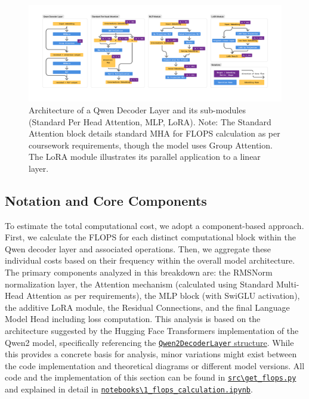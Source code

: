 \documentclass{article}
\begin{document}
\begin{figure}[!htbp]
    \centering
    \includegraphics[width=1\linewidth]{M2 Course Work//Images/Qwen_Arch.png} 
    \caption{Architecture of a Qwen Decoder Layer and its sub-modules (Standard Per Head Attention, MLP, LoRA). Note: The Standard Attention block details standard MHA for FLOPS calculation as per coursework requirements, though the model uses Group Attention. The LoRA module illustrates its parallel application to a linear layer.}
    \label{fig:qwen_arch} 
\end{figure}


\subsection{Notation and Core Components}

To estimate the total computational cost, we adopt a component-based approach. First, we calculate the FLOPS for each distinct computational block within the Qwen decoder layer and associated operations. Then, we aggregate these individual costs based on their frequency within the overall model architecture. The primary components analyzed in this breakdown are: the RMSNorm normalization layer, the Attention mechanism (calculated using Standard Multi-Head Attention as per requirements), the MLP block (with SwiGLU activation), the additive LoRA module, the Residual Connections, and the final Language Model Head including loss computation. This analysis is based on the architecture suggested by the Hugging Face Transformers implementation of the Qwen2 model, specifically referencing the \href{https://github.com/huggingface/transformers/blob/main/src/transformers/models/qwen2/modeling_qwen2.py}{\texttt{Qwen2DecoderLayer} structure}. While this provides a concrete basis for analysis, minor variations might exist between the code implementation and theoretical diagrams or different model versions. All code and the implementation of this section can be found in \href{https://gitlab.developers.cam.ac.uk/phy/data-intensive-science-mphil/assessments/m2_coursework/ym429/-/blob/main/src/get_flops.py?ref_type=heads}{\texttt{src\textbackslash get\_flops.py}} and explained in detail in \href{https://gitlab.developers.cam.ac.uk/phy/data-intensive-science-mphil/assessments/m2_coursework/ym429/-/blob/main/notebooks/2_flops_calculation.ipynb?ref_type=heads}{\texttt{notebooks\textbackslash 1\_flops\_calculation.ipynb}}.
\end{document}
